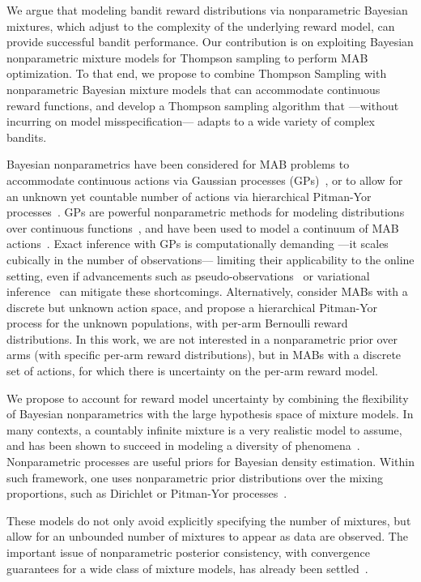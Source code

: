 We argue that modeling bandit reward distributions via nonparametric Bayesian mixtures, which adjust to the complexity of the underlying reward model, can provide successful bandit performance. 
Our contribution is on exploiting Bayesian nonparametric mixture models for Thompson sampling to perform MAB optimization. 
To that end, we propose to combine Thompson Sampling with nonparametric Bayesian mixture models that can accommodate continuous reward functions, and develop a Thompson sampling algorithm that ---without incurring on model misspecification--- adapts to a wide variety of complex bandits.

Bayesian nonparametrics have been considered for MAB problems to accommodate continuous actions via Gaussian processes (GPs)~\citep{ip-Srinivas2010,ip-Gruenewaelder2010,ic-Krause2011}, or to allow for an unknown yet countable number of actions via hierarchical Pitman-Yor processes~\citep{j-Battiston2018}.
GPs are powerful nonparametric methods for modeling distributions over continuous functions~\citep{b-Rasmussen2005}, and have been used to model a continuum of MAB actions~\citep{ic-Krause2011}.
Exact inference with GPs is computationally demanding ---it scales cubically in the number of observations--- limiting their applicability to the online setting, even if advancements such as pseudo-observations~\citep{ic-Snelson2006} or variational inference~\citep{ip-Titsias2009} can mitigate these shortcomings. 
Alternatively, \citet{j-Battiston2018} consider MABs with a discrete but unknown action space, and propose a hierarchical Pitman-Yor process for the unknown populations, with per-arm Bernoulli reward distributions. In this work, we are not interested in a nonparametric prior over arms (with specific per-arm reward distributions), but in MABs with a discrete set of actions, for which there is uncertainty on the per-arm reward model.

We propose to account for reward model uncertainty by combining the flexibility of Bayesian nonparametrics with the large hypothesis space of mixture models. In many contexts, a countably infinite mixture is a very realistic model to assume, and has been shown to succeed in modeling a diversity of phenomena~\citep{j-Gershman2012}. Nonparametric processes are useful priors for Bayesian density estimation. Within such framework, one uses nonparametric prior distributions over the mixing proportions, such as Dirichlet or Pitman-Yor processes~\citep{j-Teh2010}.

These models do not only avoid explicitly specifying the number of mixtures, but allow for an unbounded number of mixtures to appear as data are observed. The important issue of nonparametric posterior consistency, with convergence guarantees for a wide class of mixture models, has already been settled~\citep{j-Ghosal1999, j-Ghosal2001, j-Lijoi2004, j-Ghosal2007}.

